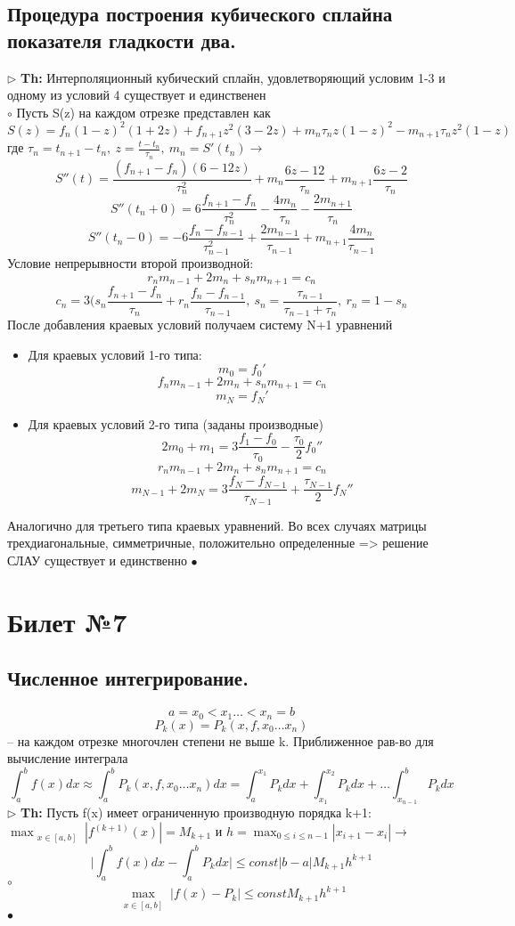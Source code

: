 \documentclass[a4paper]{article}
\begin{document}
\subsection{Процедура построения кубического сплайна показателя гладкости два.}
$\triangleright$ \textbf{Th:} Интерполяционный кубический сплайн, удовлетворяющий условим 1-3 и одному из условий 4 существует и единственен\\
	$\circ$ 
	Пусть S(z) на каждом отрезке представлен как 
	$$ S(z) = f_n(1-z)^2(1+2z) +f_{n+1}z^2(3-2z) + m_n\tau_nz(1-z)^2 -m_{n+1}\tau_nz^2(1-z)$$
	где $\tau_n = t_{n+1}-t_n, \ z = \frac{t-t_n}{\tau_n}, \ m_n = S'(t_n) \rightarrow$
	$$ S''(t) = \frac{(f_{n+1} - f_n)(6-12z)}{\tau_n^2} + m_n \frac{6z-12}{\tau_n} + m_{n+1} \frac{6z-2}{\tau_n}$$
	$$ S''(t_n+0) = 6 \frac{f_{n+1}-f_n}{\tau_n^2} - \frac{4m_n}{\tau_n} - \frac{2m_{n+1}}{\tau_n}$$
	$$ S''(t_n-0) = -6 \frac{f_n-f_{n-1}}{\tau_{n-1}^2} + \frac{2m_{n-1}}{\tau_{n-1}} + m_{n+1}\frac{4m_n}{\tau_{n-1}}$$
	Условие непрерывности второй производной:
	$$r_nm_{n-1}+2m_n+s_nm_{n+1}=c_n$$
	$$ c_n=3 \big(s_n\frac{f_{n+1}-f_n}{\tau_n}+r_n\frac{f_n-f_{n-1}}{\tau_{n-1}}, \ s_n=\frac{\tau_{n-1}}{\tau_{n-1}+\tau_n},\ r_n=1-s_n$$
	После добавления краевых условий получаем систему N+1 уравнений
	\begin{itemize}
		\item Для краевых условий 1-го типа:
		$$ m_0=f_0'$$
		$$ f_nm_{n-1} + 2m_n + s_nm_{n+1} = c_n$$
		$$ m_N=f_N'$$
		\item Для краевых условий 2-го типа (заданы производные)
		$$ 2m_0 + m_1 = 3\frac{f_1-f_0}{\tau_0} - \frac{\tau_0}{2}f_0'' $$
		$$ r_nm_{n-1} + 2m_n + s_nm_{n+1} = c_n $$
		$$ m_{N-1} + 2m_N = 3\frac{f_N-f_{N-1}}{\tau_{N-1}} + \frac{\tau_{N-1}}{2}f_N'' $$
	\end{itemize}
	Аналогично для третьего типа краевых уравнений. Во всех случаях матрицы трехдиагональные, симметричные, положительно определенные => решение СЛАУ существует и единственно
	$\bullet$

\section{Билет №7}
\subsection{Численное интегрирование.}
$$a=x_0<x_1\ldots <x_n=b$$
$$P_k(x)=P_k(x,f,x_0 \ldots x_n)$$ – на каждом отрезке многочлен степени не выше k. Приближенное рав-во для вычисление интеграла
$$ \int_{a}^b f(x)dx \approx \int_{a}^b P_k(x,f,x_0 \ldots x_n) dx = \int_{a}^{x_1} P_k dx + \int_{x_1}^{x_2} P_k dx + \ldots \int_{x_{n-1}}^b P_k dx$$
$\triangleright$ \textbf{Th:} Пусть f(x) имеет ограниченную производную порядка k+1: $\max_{\substack{x\in [a,b]}} |f^{(k+1)}(x)|=M_{k+1}$ и $h=\max_{0 \leq i \leq n-1} |x_{i+1} - x_i| \rightarrow$
$$ \big| \int_{a}^b f(x)dx - \int_{a}^b P_k dx \big| \leq const |b-a|M_{k+1}h^{k+1}$$
	$\circ$ 
		$$\max_{\substack{x \in [a,b]}} |f(x)-P_k| \leq const M_{k+1}h^{k+1} $$
	$\bullet$ 
\end{document}
